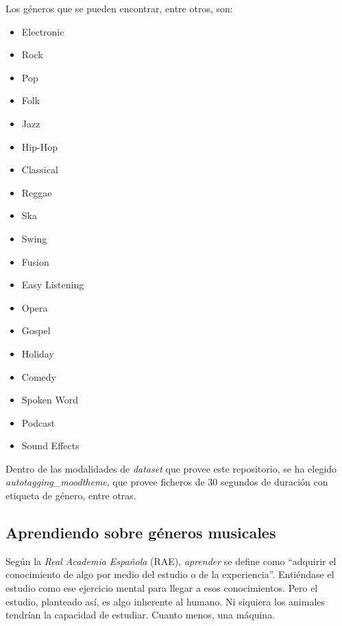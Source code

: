 Los géneros que se pueden encontrar, entre otros, son:
\begin{multicols}{4}
\begin{itemize}
    \item Electronic
    \item Rock
    \item Pop
    \item Folk
    \item Jazz
    \item Hip-Hop
    \item Classical
    \item Reggae
    \item Ska
    \item Swing
    \item Fusion
    \item Easy Listening
    \item Opera
    \item Gospel
    \item Holiday
    \item Comedy
    \item Spoken Word
    \item Podcast
    \item Sound Effects
\end{itemize}
\end{multicols}

Dentro de las modalidades de \emph{dataset} que provee este repositorio, se ha elegido \emph{autotagging\_moodtheme}, que provee ficheros de 30 segundos de duración con etiqueta de género, entre otras.


%

\subsection{Aprendiendo sobre géneros musicales}

Según la \emph{Real Academia Española} (RAE), \emph{aprender} se define como ``adquirir el conocimiento de algo por medio del estudio o de la experiencia''\citep{rae_aprender}. Entiéndase el estudio como ese ejercicio mental para llegar a esos conocimientos. Pero el estudio, planteado así, es algo inherente al humano. Ni siquiera los animales tendrían la capacidad de estudiar. Cuanto menos, una máquina.

